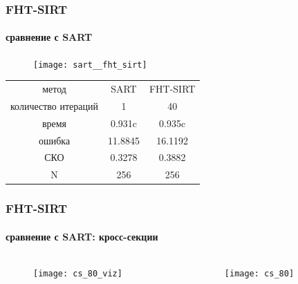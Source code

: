 \begin{frame}
\frametitle{FHT-SIRT}
\framesubtitle{сравнение с SART}
  \begin{figure}
  \texttt{[image: sart\_\_fht\_sirt]}
  \end{figure}

\vspace{0.5cm}


\small
\begin{tabular}{c|c c}
    метод & SART & FHT-SIRT \\ \vspace{5pt}
    количество итераций & 1 & 40 \\ \vspace{5pt}
    время & 0.931c & 0.935c \\ \vspace{5pt}
    ошибка & 11.8845 & 16.1192 \\ \vspace{5pt}
    СКО & 0.3278 & 0.3882 \\ \vspace{5pt}
    N & 256 & 256 \\
\end{tabular}

\end{frame}


\begin{frame}
\frametitle{FHT-SIRT}
\framesubtitle{сравнение с SART: кросс-секции}
\begin{columns}[T,onlytextwidth]
  \hspace*{-1cm}
  \begin{column}{0.4\textwidth}
    \begin{figure}
      \centering
      \texttt{[image: cs\_80\_viz]}
    \end{figure}
  \end{column}
  \begin{column}{0.6\textwidth}
    \begin{figure}
      \centering
      \texttt{[image: cs\_80]}
    \end{figure}
  \end{column}
\end{columns}
\end{frame}

